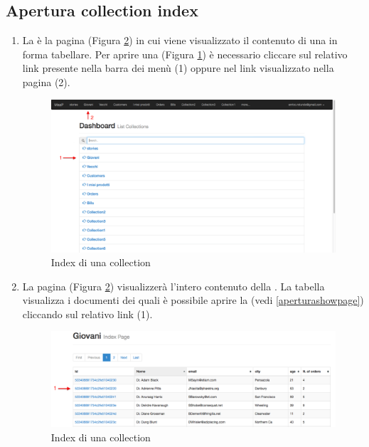 	\subsection{Apertura collection index} %
	\label{aperturacollectionindex}
		\begin{enumerate}
			\item La  è la pagina (Figura \ref{fig:collection}) in cui viene visualizzato il contenuto di una  in forma tabellare. Per aprire una  (Figura \ref{fig:aperturaCollection}) è necessario cliccare sul relativo link presente nella barra dei menù (1) oppure nel link visualizzato nella pagina  (2).

			\begin{figure}[H]
				\centering \includegraphics[width=1\textwidth]{img/aperturaCollection.png}
			\caption{ \label{fig:aperturaCollection} Index di una collection}
			\end{figure}


			\item La pagina  (Figura \ref{fig:collection}) visualizzerà l'intero contenuto della . La tabella visualizza i documenti dei quali è possibile aprire la  (vedi \ref{aperturashowpage}) cliccando sul relativo link (1).

			\begin{figure}[H]
				\centering \includegraphics[width=1\textwidth]{img/collection.png}
			\caption{ \label{fig:collection} Index di una collection}
			\end{figure}
		\end{enumerate}

